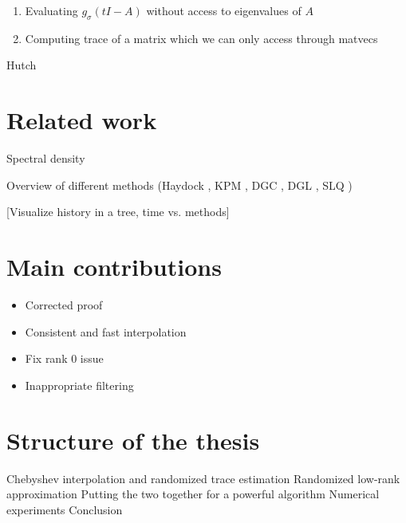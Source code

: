 \begin{enumerate}
    \item Evaluating $g_{\sigma}(tI - A)$ without access to eigenvalues of $A$
    \item Computing trace of a matrix which we can only access through matvecs
\end{enumerate}

Hutch\pp


\section{Related work}
\label{sec:1-introduction-related}

Spectral density \cite{lin2017randomized}

Overview of different methods (Haydock \cite{lin2016review}, KPM \cite{weisse2006kpm}, DGC \cite{lin2017randomized}, DGL \cite{lin2016review}, SLQ \cite{chen2021slq})

[Visualize history in a tree, time vs. methods]


\section{Main contributions}
\label{sec:1-introduction-contributions}

\begin{itemize}
    \item Corrected proof
    \item Consistent and fast interpolation
    \item Fix rank 0 issue
    \item Inappropriate filtering
\end{itemize}


\section{Structure of the thesis}
\label{sec:1-introduction-structure}

Chebyshev interpolation and randomized trace estimation 
Randomized low-rank approximation 
Putting the two together for a powerful algorithm 
Numerical experiments 
Conclusion 

